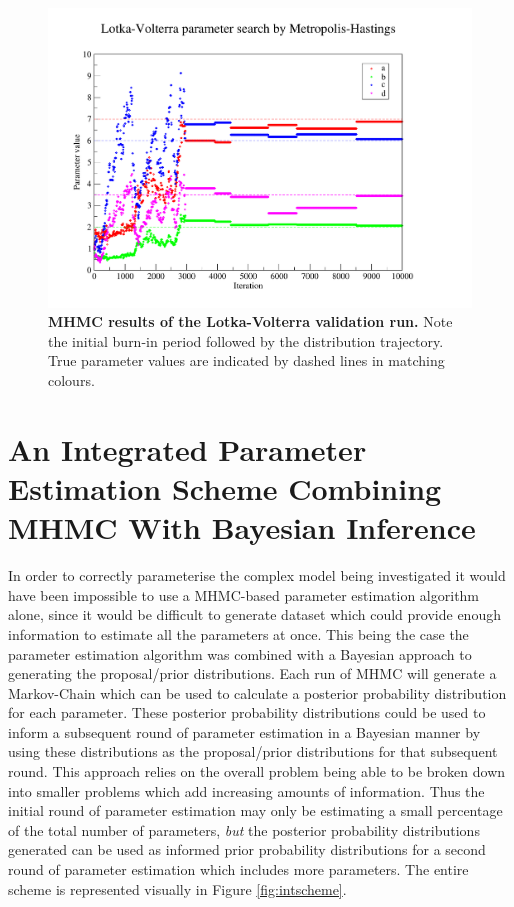 \begin{figure}[tbp]
 \centering
 \includegraphics[width=13cm, trim=50px 35px 125px 30px, clip=true]{./03-parameterestimationmethodologies/data/LV_MCMC.pdf}
 \caption[{MHMC results of the Lotka-Volterra validation run.}]{{\bf MHMC results of the Lotka-Volterra validation run.} Note the initial burn-in period followed by the distribution trajectory. True parameter values are indicated by dashed lines in matching colours.
 \label{fig:parameters}}
\end{figure}
\afterpage{\clearpage}

\section{An Integrated Parameter Estimation Scheme Combining MHMC With Bayesian Inference}
In order to correctly parameterise the complex model being investigated it would have been impossible to use a MHMC-based parameter estimation algorithm alone, since it would be difficult to generate dataset which could provide enough information to estimate all the parameters at once. This being the case the parameter estimation algorithm was combined with a Bayesian approach to generating the proposal/prior distributions. Each run of MHMC will generate a Markov-Chain which can be used to calculate a posterior probability distribution for each parameter. These posterior probability distributions could be used to inform a subsequent round of parameter estimation in a Bayesian manner by using these distributions as the proposal/prior distributions for that subsequent round. This approach relies on the overall problem being able to be broken down into smaller problems which add increasing amounts of information. Thus the initial round of parameter estimation may only be estimating a small percentage of the 
total number of parameters, \textit{but} the posterior probability distributions generated can be used as informed prior probability distributions for a second round of parameter estimation which includes more parameters. The entire scheme is represented visually in Figure \ref{fig:intscheme}.

